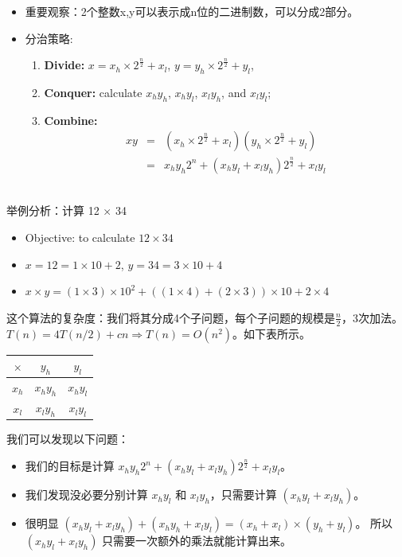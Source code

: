 \begin{itemize}
\item 
	重要观察：2个整数x,y可以表示成n位的二进制数，可以分成2部分。
\item 
	分治策略: 
\begin{enumerate}
 \item {\bf Divide:} $x=x_h \times 2^{\frac{n}{2}} + x_l$, $y=y_h \times 2^{\frac{n}{2}} + y_l$, 
 \item {\bf Conquer:} calculate $x_h y_h$, $x_h y_l$, $x_l y_h$, and $x_l y_l$;  
 \item {\bf Combine:} 
\begin{eqnarray}
                 xy &=& (x_h \times 2^{\frac{n}{2}} + x_l) (y_h \times 2^{\frac{n}{2}} + y_l) \\
                    &=& x_hy_h 2^n + ( x_hy_l + x_ly_h) 2^{\frac{n}{2}} + x_l y_l 
                \end{eqnarray} \\
\end{enumerate}
\end{itemize}

	举例分析：计算 12 × 34
\begin{itemize}
	\item	Objective: to calculate $12 \times 34 $
	\item $x=12 = 1 \times 10 + 2$, $y= 34 =3\times 10 + 4$
	\item $x\times y = (1 \times 3)\times 10^2 + ( (1 \times 4)+(2\times 3))\times 10 + 2\times 4 $
\end{itemize}
	这个算法的复杂度：我们将其分成4个子问题，每个子问题的规模是$ \frac{n}{2}$，3次加法。$T(n)=4T(n/2) + cn \Rightarrow T(n)=O(n^2)$。如下表所示。
	
\begin{table}[H]
\centering
   \begin{tabular}{|c||c|c|}\hline
   \hline
             $\times$  &  $y_{h}$ & $y_{l}$  \\
  \hline \hline
  	$x_{h}$ & $x_{h} y_{h}$ & $x_{h}y_{l}$ \\
  \hline
  	$x_{l}$ & $x_{l} y_{h}$ & $x_{l}y_{l}$ \\
  \hline
  \end{tabular}
\end{table}

	我们可以发现以下问题：
 \begin{itemize}
 	\item 我们的目标是计算 $x_hy_h 2^n + ( x_hy_l + x_ly_h) 2^{\frac{n}{2}} + x_l y_l $。
	\item 我们发现没必要分别计算  $x_hy_l$ 和  $x_ly_h$，只需要计算 $( x_hy_l + x_ly_h)$。
	\item 很明显 $( x_hy_l + x_ly_h) + ( x_hy_h + x_ly_l) = (x_{h}+x_{l}) \times (y_{h} + y_{l}) $。 
	所以$( x_hy_l + x_ly_h)$ 只需要一次额外的乘法就能计算出来。 
 \end{itemize} 	 

